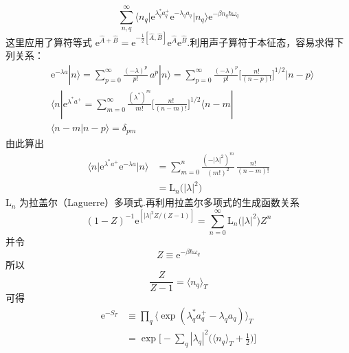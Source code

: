 \begin{equation}
  \sum_{n,q}^{\infty}\bigl\langle n_{q}\bigl|
  \mathrm{e}^{\lambda_{q}^{*}a_{q}^{+}}\mathrm{e}^{-\lambda_{q}a_{q}}
  \bigr|n_{q}\bigr\rangle\mathrm{e}^{-\beta n_{q}\hbar\omega_{q}}
\end{equation}
这里应用了算符等式
$\mathrm{e}^{\hat{A}+\hat{B}}
=\mathrm{e}^{-\frac{1}{2}[\hat{A},\hat{B}]}\mathrm{e}^{\hat{A}}\mathrm{e}^{\hat{B}}$.利用声子算符于本征态，容易求得下列关系：
\begin{equation}
\begin{aligned}
  &\mathrm{e}^{-\lambda a}|n\rangle=\sum_{p=0}^{\infty}
  \frac{(-\lambda)^{p}}{p!}\,a^{p}|n\rangle
  =\sum_{p=0}^{\infty}\frac{(-\lambda)^{p}}{p!}
  \biggl[\frac{n!}{(n-p)!}\biggr]^{1/2}|n-p\rangle\\
  &\langle n|\mathrm{e}^{\lambda^{*}a^{+}}
  =\sum_{m=0}^{\infty}\frac{(\lambda^{*})^{m}}{m!}
  \biggl[\frac{n!}{(n-m)!}\biggr]^{1/2}\langle n-m|\\
  &\langle n-m|n-p\rangle=\delta_{pm}
\end{aligned}
\end{equation}
由此算出
\begin{equation}
\begin{aligned}
  \bigl\langle n\bigl|\mathrm{e}^{\lambda^{*}a^{+}}
  \mathrm{e}^{-\lambda a}\bigr|n\bigr\rangle
  &=\sum_{m=0}^{n}\frac{(-|\lambda|^{2})^{m}}{(m!)^{2}}\,
  \frac{n!}{(n-m)!}\\
  &=\mathrm{L}_{n}\bigl(|\lambda|^{2}\bigr)
\end{aligned}
\end{equation}
$\mathrm{L}_{n}$ 为拉盖尔（Laguerre）多项式.再利用拉盖尔多项式的生成函数关系
\begin{equation}
  \left(1-Z\right)^{-1}
  \mathrm{e}^{\left[|\lambda|^{2}Z/(Z-1)\right]}
  =\sum_{n=0}^{\infty}\mathrm{L}_{n}\bigl(|\lambda|^{2}\bigr)Z^{n}
\end{equation}
并令
\begin{equation*}
  Z\equiv\mathrm{e}^{-\beta\hbar\omega_{q}}
\end{equation*}
所以
\begin{equation}
  \frac{Z}{Z-1}=\langle n_{q}\rangle_{T}
\end{equation}
可得
\begin{equation}
\begin{aligned}
  \mathrm{e}^{-S_{T}}&\equiv\prod_{q}
  \bigl\langle\exp(\lambda_{q}^{*}a_{q}^{+}-\lambda_{q}a_{q})
  \bigr\rangle_{T}\\
  &=\exp\biggl[-\sum_{q}|\lambda_{q}|^{2}
  \biggl(\langle n_{q}\rangle_{T}+\frac{1}{2}\biggr)\biggr]
\end{aligned}
\end{equation}
